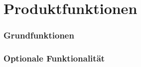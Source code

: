 \documentclass[]{book}
\begin{document}
\chapter {Produktfunktionen}

\subsection{Grundfunktionen}

\subsection{Optionale Funktionalität}
\end{document}
